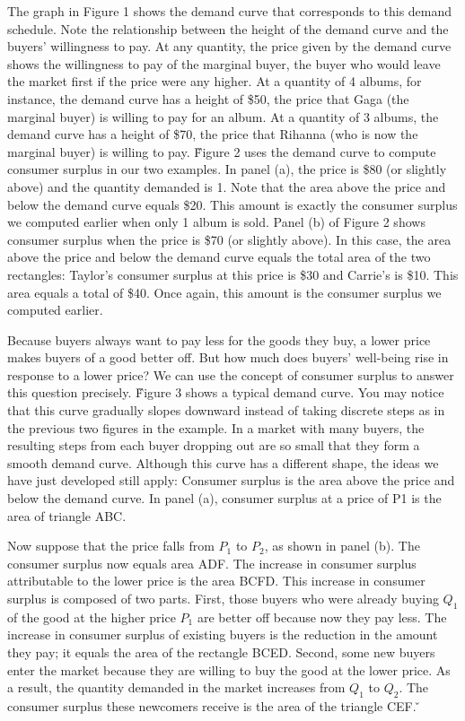 
The graph in Figure 1 shows the demand curve that corresponds to this demand schedule. Note the relationship between
the height of the demand curve and the buyers' willingness to pay. At any quantity, the price given by the demand
curve shows the willingness to pay of the marginal buyer, the buyer who would leave the market first if the price
were any higher. At a quantity of 4 albums, for instance, the demand curve has a height of \$50, the price that Gaga
(the marginal buyer) is willing to pay for an album. At a quantity of 3 albums, the demand curve has a height of
\$70, the price that Rihanna (who is now the marginal buyer) is willing to pay. \v

Figure 2 uses the demand curve to compute consumer surplus in our two examples. In panel (a), the price is \$80 (or
slightly above) and the quantity demanded is 1. Note that the area above the price and below the demand curve equals
\$20. This amount is exactly the consumer surplus we computed earlier when only 1 album is sold. Panel (b) of Figure
2 shows consumer surplus when the price is \$70 (or slightly above). In this case, the area above the price and below
the demand curve equals the total area of the two rectangles: Taylor's consumer surplus at this price is \$30 and
Carrie's is \$10. This area equals a total of \$40. Once again, this amount is the consumer surplus we computed earlier.


Because buyers always want to pay less for the goods they buy, a lower price makes buyers of a good better off. But
how much does buyers' well-being rise in response to a lower price? We can use the concept of consumer surplus to
answer this question precisely. \v

Figure 3 shows a typical demand curve. You may notice that this curve gradually slopes downward instead of taking
discrete steps as in the previous two figures in the example. In a market with many buyers, the resulting steps from
each buyer dropping out are so small that they form a smooth demand curve. Although this curve has a different shape,
the ideas we have just developed still apply: Consumer surplus is the area above the price and below the demand curve.
In panel (a), consumer surplus at a price of P1 is the area of triangle ABC\@.


Now suppose that the price falls from $P_1$ to $P_2$, as shown in panel (b). The consumer surplus now equals area ADF\@.
The increase in consumer surplus attributable to the lower price is the area BCFD. This increase in consumer
surplus is composed of two parts. First, those buyers who were already buying $Q_1$ of the good at the higher price
$P_1$ are better off because now they pay less. The increase in consumer surplus of existing buyers is the reduction
in the amount they pay; it equals the area of the rectangle BCED. Second, some new buyers enter the market because
they are willing to buy the good at the lower price. As a result, the quantity demanded in the market increases from
$Q_1$ to $Q_2$. The consumer surplus these newcomers receive is the area of the triangle CEF. \v


